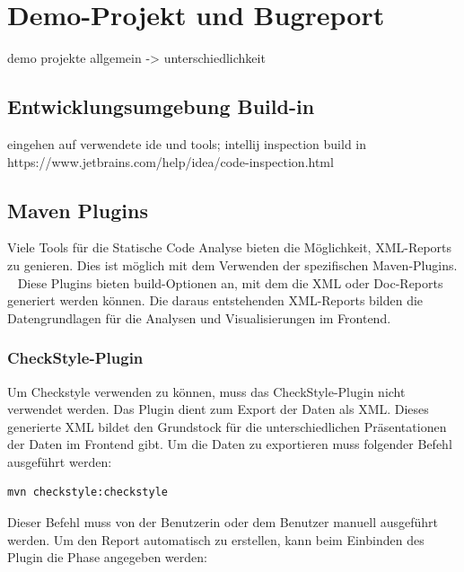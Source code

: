 \section{Demo-Projekt und Bugreport}
demo projekte allgemein -> unterschiedlichkeit

\subsection{Entwicklungsumgebung Build-in}
eingehen auf verwendete ide und tools; intellij inspection build in 
https://www.jetbrains.com/help/idea/code-inspection.html

\subsection{Maven Plugins}
Viele Tools für die Statische Code Analyse bieten die Möglichkeit, XML-Reports zu genieren. Dies ist möglich mit dem Verwenden der spezifischen Maven-Plugins. ~\parencite{spotBugsUsage} \cite{checkstylePlugin} 
Diese Plugins bieten build-Optionen an, mit dem die XML oder Doc-Reports generiert werden können. Die daraus entstehenden XML-Reports bilden die Datengrundlagen für die Analysen und Visualisierungen im Frontend.
\subsubsection{CheckStyle-Plugin}
Um Checkstyle verwenden zu können, muss das CheckStyle-Plugin nicht verwendet werden. Das Plugin dient zum Export der Daten als XML. Dieses generierte XML bildet den Grundstock für die unterschiedlichen Präsentationen der Daten im Frontend gibt. Um die Daten zu exportieren muss folgender Befehl ausgeführt werden:
\begin{verbatim}
mvn checkstyle:checkstyle
\end{verbatim}
Dieser Befehl muss von der Benutzerin oder dem Benutzer manuell ausgeführt werden. Um den Report automatisch zu erstellen, kann beim Einbinden des Plugin die Phase angegeben werden:

\lstset{
  caption={Das Plugin wird automatisch in der install-Phase ausgeführt.}, 
  basicstyle=\small\ttfamily, 
  label=lst:main, 
  language=Java,
  frame=single,
  breaklines=true, %
  postbreak=\mbox{\textcolor{red}{$\hookrightarrow$}\space},
}

